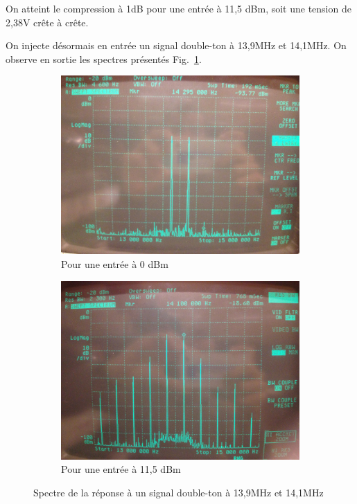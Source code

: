 \documentclass{article}
\begin{document}

On atteint le compression à 1dB pour une entrée à 11,5 dBm, soit une tension de 2,38V crête à crête.



On injecte désormais en entrée un signal double-ton à 13,9MHz et 14,1MHz. On observe en sortie les spectres présentés Fig.~\ref{fig:6_double}.

\begin{figure}[h]
	\centering
	\begin{subfigure}[b]{0.43\textwidth}
		\centering
		\includegraphics[width=\textwidth]{6_3_6_0dbm}
		\caption{Pour une entrée à 0 dBm}
	\end{subfigure}
	\hfill
	\begin{subfigure}[b]{0.43\textwidth}
		\centering
		\includegraphics[width=\textwidth]{6_3_6_11x5dbm}
		\caption{Pour une entrée à 11,5 dBm}
	\end{subfigure}
	\caption{Spectre de la réponse à un signal double-ton à 13,9MHz et 14,1MHz}
	\label{fig:6_double}
\end{figure}
\end{document}
